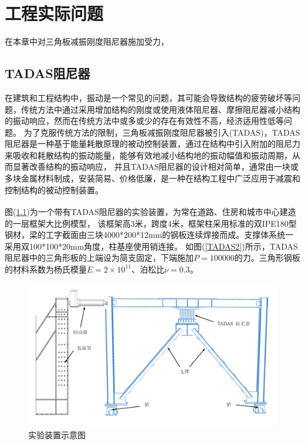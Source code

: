 \chapter{工程实际问题}
在本章中对三角板减振刚度阻尼器施加受力，
\section{TADAS阻尼器}

在建筑和工程结构中，振动是一个常见的问题，其可能会导致结构的疲劳破坏等问题，传统方法中通过采用增加结构的刚度或使用液体阻尼器、摩擦阻尼器减小结构的振动响应，然而在传统方法中或多或少的存在有效性不高，经济适用性低等问题。
为了克服传统方法的限制，三角板减振刚度阻尼器被引入(TADAS)，TADAS阻尼器是一种基于能量耗散原理的被动控制装置，通过在结构中引入附加的阻尼力来吸收和耗散结构的振动能量，能够有效地减小结构地的振动幅值和振动周期，从而显著改善结构的振动响应，
并且TADAS阻尼器的设计相对简单，通常由一块或多块金属材料制成，安装简易、价格低廉，是一种在结构工程中广泛应用于减震和控制结构的被动控制装置。\par
图(\ref{TADAS1})为一个带有TADAS阻尼器的实验装置\textsuperscript{\cite{mohammadi2017,kim2016}}，为常在道路、住房和城市中心建造的一层框架大比例模型，
该框架高3米，跨度4米，框架柱采用标准的双IPE180型钢材，梁的工字截面由三块4000*200*12mm的钢板连续焊接而成。支撑体系统一采用双100*100*20mm角度，柱基座使用销连接。
如图(\ref{TADAS2})所示，TADAS阻尼器中的三角形板的上端设为简支固定，下端施加$P=100000$的力。三角形钢板的材料系数为杨氏模量$E=2\times 10^{11}$、泊松比$\nu=0.3$。
\begin{figure}[H]
    \centering
    \includegraphics[scale=0.4]{figure/TADAS/1.png}
    \caption{实验装置示意图}\label{TADAS1}
\end{figure}

